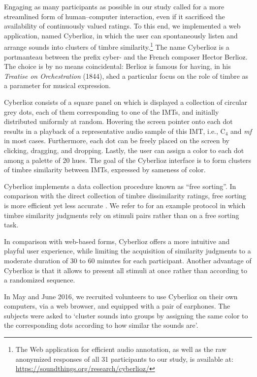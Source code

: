 \documentclass{bmcart}
\makeatletter
\newcommand*{\ie}{i.e.,\@\xspace}
\makeatother
\begin{document}
Engaging as many participants as possible in our study called for a more streamlined form of human--computer interaction, even if it sacrificed the availability of continuously valued ratings.
To this end, we implemented a web application, named Cyberlioz, in which the user can spontaneously listen and arrange sounds into clusters of timbre similarity.\footnote{The Web application for efficient audio annotation, as well as the raw anonymized responses of all 31 participants to our study, is available at: \url{https://soundthings.org/research/cyberlioz/}}
The name Cyberlioz is a portmanteau between the prefix cyber- and the French composer Hector Berlioz.
The choice is by no means coincidental: Berlioz is famous for having, in his \emph{Treatise on Orchestration} (1844), shed a particular focus on the role of timbre as a parameter for musical expression.

Cyberlioz consists of a square panel on which is displayed a collection of circular grey dots, each of them corresponding to one of the IMTs, and initially distributed uniformly at random.
Hovering the screen pointer onto each dot results in a playback of a representative audio sample of this IMT, \ie{} $\mathrm{C}_4$ and \emph{mf} in most cases. Furthermore, each dot can be freely placed on the screen by clicking, dragging, and dropping.
Lastly, the user can assign a color to each dot among a palette of 20 hues.
The goal of the Cyberlioz interface is to form clusters of timbre similarity between IMTs, expressed by sameness of color.

Cyberlioz implements a data collection procedure known as ``free sorting''. In comparison with the direct collection of timbre dissimilarity ratings, free sorting is more efficient yet less accurate \cite{giordano2011multivariate}. We refer to \cite{elliott2013jasa} for an example protocol in which timbre similarity judgments rely on stimuli pairs rather than on a free sorting task.

In comparison with web-based forms, Cyberlioz offers a more intuitive and playful user experience, while limiting the acquisition of similarity judgments to a moderate duration of $30$ to $60$ minutes for each participant.
Another advantage of Cyberlioz is that it allows to present all stimuli at once rather than according to a randomized sequence.

In May and June 2016, we recruited volunteers to use Cyberlioz on their own computers, via a web browser, and equipped with a pair of earphones. The subjects were asked to ‘cluster sounds into groups by assigning the same color to the corresponding dots according to how similar the sounds are’.
\end{document}
